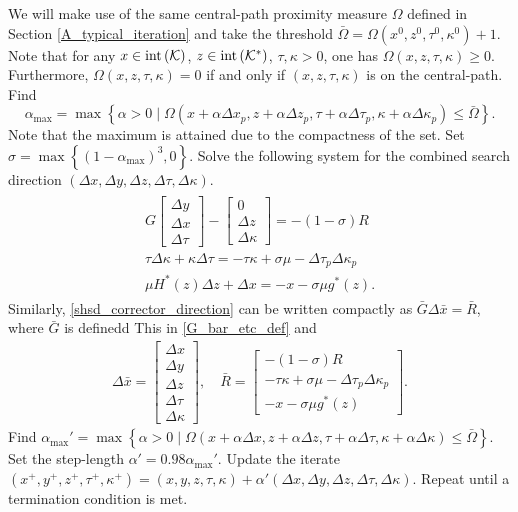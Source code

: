 \documentclass[10pt]{article}
\theoremstyle{definition}
\theoremstyle{plain}
\def\interior{\protect{\textnormal{int}}}
\begin{document}
We will make use of the same central-path proximity measure $\Omega$ defined in Section \ref{A_typical_iteration} and take the threshold $\bar{\Omega} = \Omega\left(x^0, z^0, \tau^0, \kappa^0\right)+1$. Note that for any $x\in \interior\left(\mathcal{K}\right)$, $z\in \interior\left(\mathcal{K}^*\right)$, $\tau,\kappa > 0$, one has $\Omega(x,z,\tau,\kappa) \geq 0$. Furthermore, $\Omega(x,z,\tau,\kappa) = 0$ if and only if $(x,z,\tau,\kappa)$ is on the central-path. Find \[\alpha_{\max} = \max \left\{\alpha > 0 \mid \Omega(x+\alpha\Delta x_p,z+\alpha\Delta z_p,\tau+\alpha\Delta\tau_p,\kappa+\alpha\Delta\kappa_p)\leq \bar\Omega\right\}.\] Note that the maximum is attained due to the compactness of the set. Set $\sigma = \max \left\{ (1-\alpha_{\max})^3, 0 \right\}$. Solve the following system for the combined search direction $(\Delta x, \Delta y, \Delta z, \Delta \tau, \Delta \kappa)$.
\begin{align}
\begin{split}
G \begin{bmatrix}
\Delta y \\ \Delta x \\ \Delta \tau
\end{bmatrix} - 
\begin{bmatrix}
0 \\ \Delta z \\ \Delta \kappa
\end{bmatrix} = -\left(1-\sigma\right)R \\[1ex]
\tau\Delta \kappa+\kappa\Delta \tau = -\tau\kappa + \sigma \mu - \Delta \tau_p \Delta \kappa_p \\[1ex]
\mu H^*(z)\Delta z + \Delta x = -x - \sigma\mu g^*(z).
\end{split}	\label{shsd_corrector_direction}
\end{align}
Similarly, \eqref{shsd_corrector_direction} can be written compactly as $\bar G \Delta \bar x = \bar R$, where $\bar G$ is definedd This in \eqref{G_bar_etc_def} and 
\begin{align}\label{G_Bar_etc_2}
\Delta \bar{x} = \begin{bmatrix}
\Delta x \\ \Delta y \\ \Delta z \\ \Delta \tau \\ \Delta \kappa
\end{bmatrix},\quad \bar{R} = \begin{bmatrix}
-\left(1-\sigma\right)R \\ -\tau\kappa +\sigma \mu - \Delta \tau_p \Delta \kappa_p\\ -x - \sigma\mu g^*(z)
\end{bmatrix}.
\end{align}
Find $\alpha_{\max}' = \max \left\{\alpha > 0 \mid \Omega(x+\alpha\Delta x,z+\alpha\Delta z,\tau+\alpha\Delta\tau,\kappa+\alpha\Delta\kappa)\leq \bar\Omega\right\}$. Set the step-length $\alpha' = 0.98\alpha_{\max}'$. Update the iterate $(x^+,y^+,z^+, \tau^+, \kappa^+) = (x,y,z,\tau,\kappa) + \alpha' (\Delta x, \Delta y, \Delta z, \Delta \tau, \Delta \kappa)$. Repeat until a termination condition is met.
\end{document}
